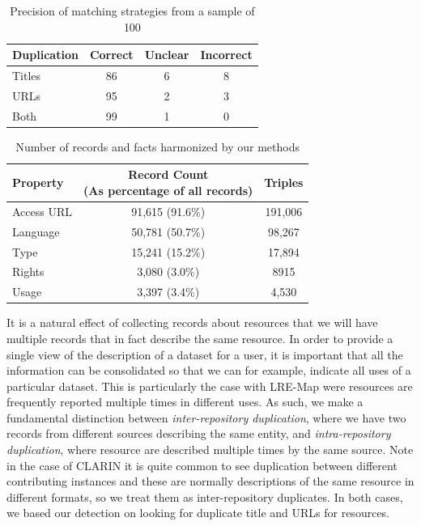 \documentclass[smallextended]{svjour3}       %
\begin{document}
\begin{table}
    \begin{tabular}{l|ccc}
        Duplication & Correct & Unclear & Incorrect \\
        \hline                    
        Titles      &    86   &   6     &    8      \\ 
        URLs        &    95   &   2     &    3      \\
        Both        &    99   &   1     &    0      \\
    \end{tabular}
    \caption{\label{tab:dupe-precision}Precision of matching strategies from a
    sample of 100}
\end{table}

\begin{table}
    \begin{tabular}{l|cc}
        Property   &  \thead{Record Count\\(As percentage of all records)} & Triples \\
        \hline
        Access URL &  91,615 (91.6\%) & 191,006  \\
        Language   &  50,781 (50.7\%) & 98,267   \\
        Type       &  15,241 (15.2\%) & 17,894   \\
        Rights     &   3,080 (3.0\%)  & 8915     \\
        Usage      &   3,397 (3.4\%)  & 4,530    \\ 
    \end{tabular}
    \caption{\label{tab:total}Number of records and facts harmonized by our
    methods}
\end{table}
        
It is a natural effect of collecting records about resources that we will have
multiple records that in fact describe the same resource. In order to provide a
single view of the description of a dataset for a user, it is important that all
the information can be consolidated so that we can for example, indicate all
uses of a particular dataset. This is particularly the case with LRE-Map were
resources are frequently reported multiple times in different uses. As such, we 
make a fundamental distinction between \emph{inter-repository duplication},
where we have two records from different sources describing the same entity, and
\emph{intra-repository duplication}, where resource are described multiple times
by the same source. Note in the case of CLARIN it is quite common to see
duplication between different contributing instances and these are normally
descriptions of the same resource in different formats, so we treat them as
inter-repository duplicates. In both cases, we based our detection on looking
for duplicate title and URLs for resources.
\end{document}
